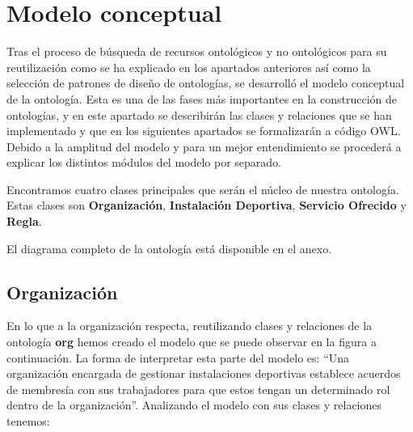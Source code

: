\documentclass[a4paper,12pt]{article}
\begin{document}
	\section{Modelo conceptual}
	
	Tras el proceso de búsqueda de recursos ontológicos y no ontológicos para su reutilización
como se ha explicado en los apartados anteriores así como la selección de patrones de diseño de
ontologías, se desarrolló el modelo conceptual de la ontología. Esta es una de las fases más
importantes en la construcción de ontologías, y en este apartado se describirán las
clases y relaciones que se han implementado y que en los siguientes apartados se formalizarán a
código OWL. Debido a la amplitud del modelo y para un mejor entendimiento se procederá a
explicar los distintos módulos del modelo por separado.
	
	Encontramos cuatro clases principales que serán el núcleo de nuestra ontología.
Estas clases son \textbf{Organización}, \textbf{Instalación Deportiva}, \textbf{Servicio Ofrecido} y \textbf{Regla}.
	
	El diagrama completo de la ontología está disponible en el anexo.
	
	\subsection{Organización}
	
	En lo que a la organización respecta, reutilizando clases y relaciones de la ontología \textbf{org} hemos
creado el modelo que se puede observar en la figura a continuación. La forma de interpretar esta parte del
modelo es: “Una organización encargada de gestionar instalaciones deportivas establece acuerdos
de membresía con sus trabajadores para que estos tengan un determinado rol dentro de la
organización”. Analizando el modelo con sus clases y relaciones tenemos:
	
\end{document}
